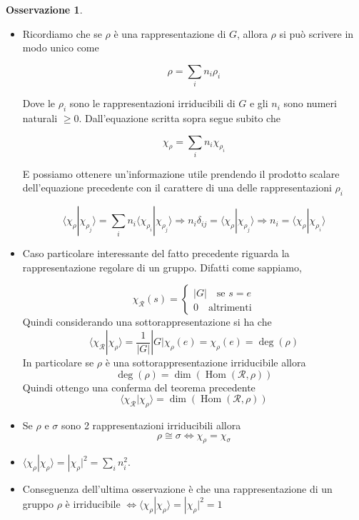 \documentclass[11pt]{article}
\theoremstyle{plain}
\theoremstyle{definition}
\newtheorem*{rem}{Osservazione}
\theoremstyle{remark}
\newcommand{\dsum}{\displaystyle\sum}
\DeclareMathOperator{\Hom}{Hom}
\begin{document}
\begin{rem}

  \begin{itemize}
  \item Ricordiamo che se $\rho$ è una rappresentazione di $G$, allora $\rho$ si può scrivere in modo unico come

    \[ \rho = \dsum_i n_i \rho_i\]

    Dove le $\rho_i$ sono le rappresentazioni irriducibili di $G$ e gli $n_i$ sono numeri naturali $\geq 0$. Dall'equazione scritta sopra segue subito che

    \[ \chi_\rho = \dsum_i n_i \chi_{\rho_i}\]

    E possiamo ottenere un'informazione utile prendendo il prodotto scalare dell'equazione precedente con il carattere di una delle rappresentazioni $\rho_i$

    \[ \langle \chi_\rho | \chi_{\rho_j} \rangle = \dsum_i n_i \langle \chi_{\rho_i} | \chi_{\rho_j} \rangle \Rightarrow n_i \delta_{ij} = \langle \chi_\rho | \chi_{\rho_j} \rangle \Rightarrow n_i = \langle \chi_\rho | \chi_{\rho_i} \rangle\]

  \item Caso particolare interessante del fatto precedente riguarda la rappresentazione regolare di un gruppo. Difatti come sappiamo,

    \[ \chi_{\mathcal{R}}(s) =
    \begin{cases}
      |G| \quad \text{se } s = e \\
      0 \quad \text{altrimenti}
    \end{cases}\]
    Quindi considerando una sottorappresentazione  si ha che
    \[
    \langle \chi_{\mathcal{R}} | \chi_\rho \rangle = \frac{1}{|G|}|G|\chi_{\rho}(e)=\chi_{\rho}(e)=\deg(\rho)
    \]
    In particolare se $\rho$ è una sottorappresentazione irriducibile allora
    \[ \deg(\rho)=\dim(\Hom(\mathcal{R},\rho)) \]
    Quindi ottengo una conferma del teorema precedente
    \[
    \langle \chi_{\mathcal{R}} | \chi_\rho \rangle =\dim(\Hom(\mathcal{R},\rho))
    \]

  \item Se $\rho$ e $\sigma$ sono 2 rappresentazioni irriducibili allora $$\rho \cong \sigma \Leftrightarrow \chi_{\rho}=\chi_{\sigma}$$

  \item $\langle \chi_\rho | \chi_\rho \rangle = |\chi_\rho|^2 = \sum_i n_i^2$.
  \item Conseguenza dell'ultima osservazione è che una rappresentazione di un gruppo $\rho$ è irriducibile $\Leftrightarrow \langle \chi_\rho | \chi_\rho \rangle = |\chi_\rho|^2 = 1$


  \end{itemize}

\end{rem}
\end{document}
